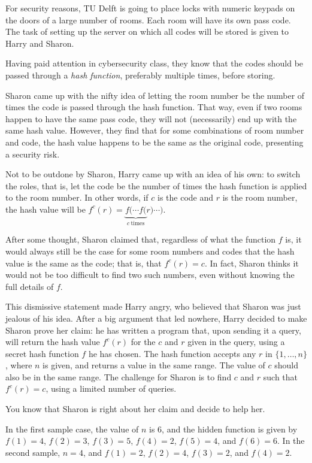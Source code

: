 





For security reasons, TU Delft is going to place locks with numeric keypads on the doors of a large number of rooms. Each room will have its own pass code. The task of setting up the server on which all codes will be stored is given to Harry and Sharon.

Having paid attention in cybersecurity class, they know that the codes should be passed through a \emph{hash function}, preferably multiple times, before storing.

Sharon came up with the nifty idea of letting the room number be the number of times the code is passed through the hash function. That way, even if two rooms happen to have the same pass code, they will not (necessarily) end up with the same hash value. However, they find that for some combinations of room number and code, the hash value happens to be the same as the original code, presenting a security risk.

Not to be outdone by Sharon, Harry came up with an idea of his own: to switch the roles, that is, let the code be the number of times the hash function is applied to the room number. In other words, if $c$ is the code and $r$ is the room number, the hash value will be $f^c(r) = \underbrace{f(\cdots f(}_{c~\mathrm{times}}r)\cdots)$.

After some thought, Sharon claimed that, regardless of what the function $f$ is, it would always still be the case for some room numbers and codes that the hash value is the same as the code; that is, that $f^c(r) = c$. In fact, Sharon thinks it would not be too difficult to find two such numbers, even without knowing the full details of $f$.

This dismissive statement made Harry angry, who believed that Sharon was just jealous of his idea. After a big argument that led nowhere, Harry decided to make Sharon prove her claim: he has written a program that, upon sending it a query, will return the hash value $f^c(r)$ for the $c$ and $r$ given in the query, using a secret hash function $f$ he has chosen. The hash function accepts any $r$ in $\{1,\dots,n\}$, where $n$ is given, and returns a value in the same range. The value of $c$ should also be in the same range. The challenge for Sharon is to find $c$ and $r$ such that $f^c(r) = c$, using a limited number of queries.

You know that Sharon is right about her claim and decide to help her.

In the first sample case, the value of $n$ is 6, and the hidden function is
given by $f(1) = 4$, $f(2) = 3$, $f(3) = 5$, $f(4) = 2$, $f(5) = 4$, and $f(6) =
6$. In the second sample, $n = 4$, and $f(1) = 2$, $f(2) = 4$, $f(3) = 2$, and $f(4) = 2$.

\vspace{-0.5em}


